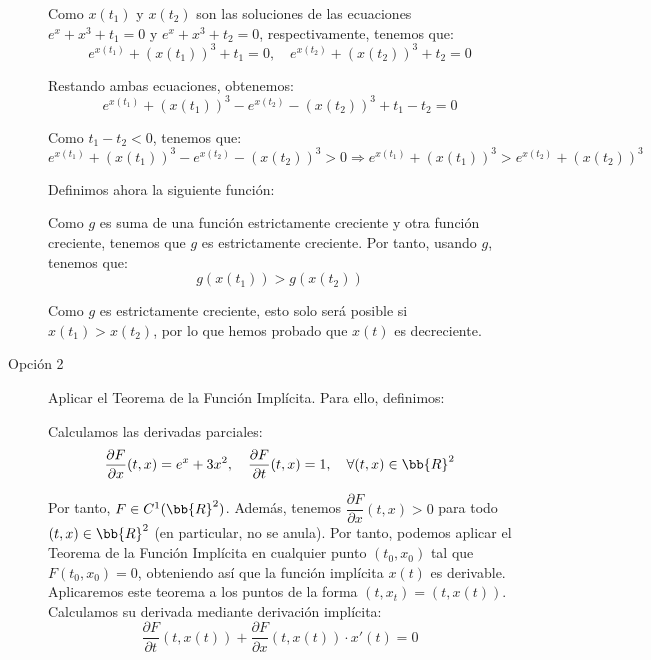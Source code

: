 \documentclass[12pt]{article}
\begin{document}
\begin{ejercicio}
\begin{description}
            Como $x(t_1)$ y $x(t_2)$ son las soluciones de las ecuaciones $e^x + x^3 + t_1 = 0$ y $e^x + x^3 + t_2 = 0$, respectivamente, tenemos que:
            \begin{equation*}
                e^{x(t_1)} + (x(t_1))^3 + t_1 = 0, \quad e^{x(t_2)} + (x(t_2))^3 + t_2 = 0
            \end{equation*}

            Restando ambas ecuaciones, obtenemos:
            \begin{equation*}
                e^{x(t_1)} + (x(t_1))^3 - e^{x(t_2)} - (x(t_2))^3 + t_1 - t_2 = 0
            \end{equation*}

            Como $t_1-t_2 < 0$, tenemos que:
            \begin{equation*}
                e^{x(t_1)} + (x(t_1))^3 - e^{x(t_2)} - (x(t_2))^3 > 0 \Longrightarrow
                e^{x(t_1)} + (x(t_1))^3 > e^{x(t_2)} + (x(t_2))^3
            \end{equation*}

            Definimos ahora la siguiente función:

            Como $g$ es suma de una función estrictamente creciente y otra función creciente, tenemos que $g$ es estrictamente creciente. Por tanto, usando $g$, tenemos que:
            \begin{equation*}
                g(x(t_1)) > g(x(t_2))
            \end{equation*}

            Como $g$ es estrictamente creciente, esto solo será posible si $x(t_1) > x(t_2)$, por lo que hemos probado que $x(t)$ es decreciente.

            \item[Opción 2] Aplicar el Teorema de la Función Implícita. Para ello, definimos:

            Calculamos las derivadas parciales:
            \begin{equation*}
                \dfrac{\partial F}{\partial x}(t,x) = e^x + 3x^2, \quad \dfrac{\partial F}{\partial t}(t,x) = 1, \quad \forall (t,x)\in\bb{R}^2
            \end{equation*}

            Por tanto, $F\in C^1(\bb{R}^2)$. Además, tenemos $\dfrac{\partial F}{\partial x} (t, x) > 0$ para todo $(t, x)\in\bb{R}^2$ (en particular, no se anula). Por tanto, podemos aplicar el Teorema de la Función Implícita en cualquier punto $(t_0, x_0)$ tal que $F(t_0, x_0) = 0$,
            obteniendo así que la función implícita $x(t)$ es derivable. Aplicaremos este teorema a los puntos de la forma $(t,x_t)=(t,x(t))$. Calculamos su derivada mediante derivación implícita:
            \begin{equation*}
                \dfrac{\partial F}{\partial t}(t, x(t)) + \dfrac{\partial F}{\partial x}(t, x(t))\cdot x'(t) = 0
            \end{equation*}


\end{description}
\end{ejercicio}
\end{document}
